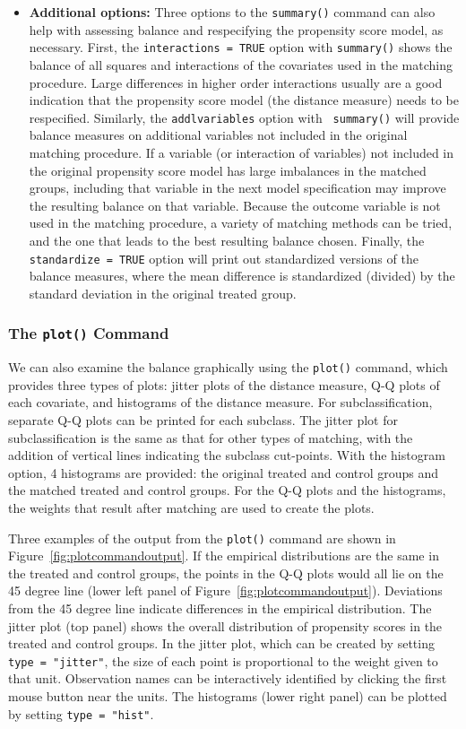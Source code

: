 \begin{itemize}
\item {\bf Additional options:} Three options to the \texttt{summary()}
  command can also help with assessing balance and respecifying the
  propensity score model, as necessary.  First, the {\tt interactions
    = TRUE} option with {\tt summary()} shows the balance of all
  squares and interactions of the covariates used in the matching
  procedure.  Large differences in higher order interactions usually
  are a good indication that the propensity score model (the distance measure) needs to be
  respecified.  Similarly, the {\tt addlvariables} option with {\tt
    summary()} will provide balance measures on additional variables
  not included in the original matching procedure.  If a variable (or
  interaction of variables) not included in the original propensity score model
  has large imbalances in the matched groups, including that
  variable in the next model specification may improve the resulting
  balance on that variable.  Because the outcome variable is not used
  in the matching procedure, a variety of matching methods can be
  tried, and the one that leads to the best resulting balance chosen.  Finally,
  the {\tt standardize = TRUE} option will print out standardized versions of the
  balance measures, where the mean difference is standardized (divided) by the standard deviation
  in the original treated group.
\end{itemize}

\subsubsection{The \texttt{plot()} Command}

We can also examine the balance graphically using the \texttt{plot()}
command, which provides three types of plots: jitter plots of the
distance measure, Q-Q plots of each covariate, and histograms of the
distance measure.  For subclassification, separate Q-Q plots can be
printed for each subclass.  The jitter plot for subclassification is
the same as that for other types of matching, with the addition of
vertical lines indicating the subclass cut-points.  With the histogram
option, 4 histograms are provided: the original treated and control
groups and the matched treated and control groups.  For the Q-Q plots
and the histograms, the weights that result after matching are used to
create the plots.

Three examples of the output from the {\tt plot()} command are shown
in Figure~\ref{fig:plotcommandoutput}.  If the empirical distributions
are the same in the treated and control groups, the points in the Q-Q
plots would all lie on the 45 degree line (lower left panel of
Figure~\ref{fig:plotcommandoutput}).  Deviations from the 45 degree
line indicate differences in the empirical distribution.  The jitter
plot (top panel) shows the overall distribution of propensity scores
in the treated and control groups.  In the jitter plot, which can be
created by setting \texttt{type = "jitter"}, the size of each point is
proportional to the weight given to that unit.  Observation names can
be interactively identified by clicking the first mouse button near
the units.  The histograms (lower right panel) can be plotted by
setting \texttt{type = "hist"}.

